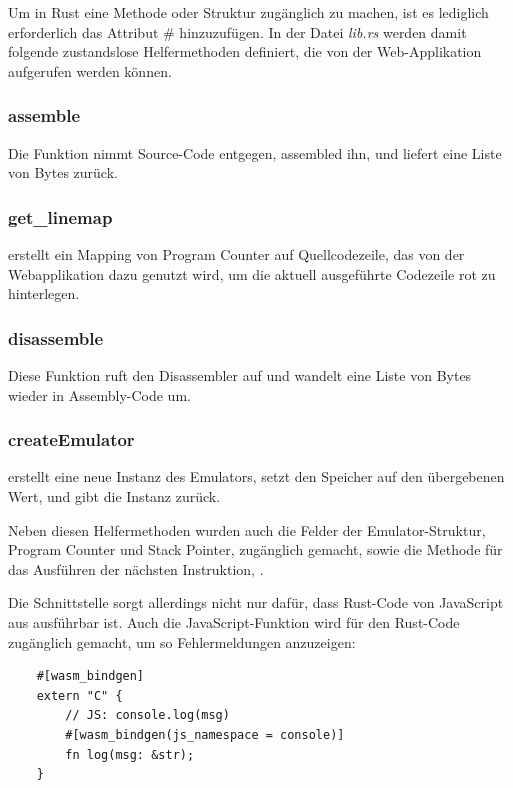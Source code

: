Um in Rust eine Methode oder Struktur zugänglich zu machen, ist es lediglich erforderlich das Attribut \# hinzuzufügen.
In der Datei \textit{lib.rs} werden damit folgende zustandslose Helfermethoden definiert, die von der Web-Applikation aufgerufen werden können.

\subsubsection*{assemble}

Die Funktion  nimmt Source-Code entgegen, assembled ihn, und liefert eine Liste von Bytes zurück.

\subsubsection*{get_linemap}

 erstellt ein Mapping von Program Counter auf Quellcodezeile, das von der Webapplikation dazu genutzt wird, um die aktuell ausgeführte Codezeile rot zu hinterlegen.

\subsubsection*{disassemble}

Diese Funktion ruft den Disassembler auf und wandelt eine Liste von Bytes wieder in Assembly-Code um.

\subsubsection*{createEmulator}

 erstellt eine neue Instanz des Emulators, setzt den Speicher auf den übergebenen Wert, und gibt die Instanz zurück.

Neben diesen Helfermethoden wurden auch die Felder der Emulator-Struktur, Program Counter und Stack Pointer, zugänglich gemacht, sowie die Methode für das Ausführen der nächsten Instruktion, .

Die Schnittstelle sorgt allerdings nicht nur dafür, dass Rust-Code von JavaScript aus ausführbar ist. Auch die JavaScript-Funktion  wird für den Rust-Code zugänglich gemacht, um so Fehlermeldungen anzuzeigen:

\begin{verbatim}
    #[wasm_bindgen]
    extern "C" {
        // JS: console.log(msg)
        #[wasm_bindgen(js_namespace = console)]
        fn log(msg: &str);
    }
\end{verbatim}

